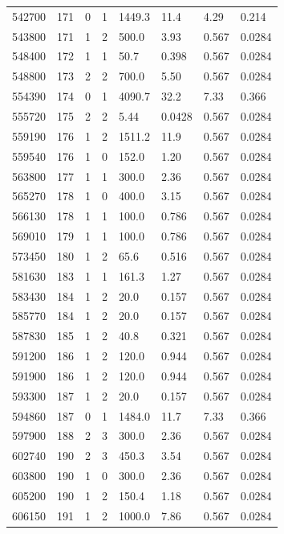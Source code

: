 \documentclass[preview]{standalone}
\begin{document}
{{{{{\begin{tabular}{L{1.2cm}C{1.2cm} C{0.3cm}C{0.5cm} C{1.4cm}C{1.4cm} C{1.4cm}C{1.4cm}}
  542700  &   171  & 0     &  1 &  1449.3  & 11.4  & 4.29 &  0.214   \\ 
  543800  &   171  & 1     &  2 &  500.0  & 3.93  & 0.567 &  0.0284   \\ 
  548400  &   172  & 1     &  1 &  50.7  & 0.398  & 0.567 &  0.0284   \\ 
  548800  &   173  & 2     &  2 &  700.0  & 5.50  & 0.567 &  0.0284   \\ 
  554390  &   174  & 0     &  1 &  4090.7  & 32.2  & 7.33 &  0.366   \\ 
  555720  &   175  & 2     &  2 &  5.44  & 0.0428  & 0.567 &  0.0284   \\ 
  559190  &   176  & 1     &  2 &  1511.2  & 11.9  & 0.567 &  0.0284   \\ 
  559540  &   176  & 1     &  0 &  152.0  & 1.20  & 0.567 &  0.0284   \\ 
  563800  &   177  & 1     &  1 &  300.0  & 2.36  & 0.567 &  0.0284   \\ 
  565270  &   178  & 1     &  0 &  400.0  & 3.15  & 0.567 &  0.0284   \\ 
  566130  &   178  & 1     &  1 &  100.0  & 0.786  & 0.567 &  0.0284   \\ 
  569010  &   179  & 1     &  1 &  100.0  & 0.786  & 0.567 &  0.0284   \\ 
  573450  &   180  & 1     &  2 &  65.6  & 0.516  & 0.567 &  0.0284   \\ 
  581630  &   183  & 1     &  1 &  161.3  & 1.27  & 0.567 &  0.0284   \\ 
  583430  &   184  & 1     &  2 &  20.0  & 0.157  & 0.567 &  0.0284   \\ 
  585770  &   184  & 1     &  2 &  20.0  & 0.157  & 0.567 &  0.0284   \\ 
  587830  &   185  & 1     &  2 &  40.8  & 0.321  & 0.567 &  0.0284   \\ 
  591200  &   186  & 1     &  2 &  120.0  & 0.944  & 0.567 &  0.0284   \\ 
  591900  &   186  & 1     &  2 &  120.0  & 0.944  & 0.567 &  0.0284   \\ 
  593300  &   187  & 1     &  2 &  20.0  & 0.157  & 0.567 &  0.0284   \\ 
  594860  &   187  & 0     &  1 &  1484.0  & 11.7  & 7.33 &  0.366   \\ 
  597900  &   188  & 2     &  3 &  300.0  & 2.36  & 0.567 &  0.0284   \\ 
  602740  &   190  & 2     &  3 &  450.3  & 3.54  & 0.567 &  0.0284   \\ 
  603800  &   190  & 1     &  0 &  300.0  & 2.36  & 0.567 &  0.0284   \\ 
  605200  &   190  & 1     &  2 &  150.4  & 1.18  & 0.567 &  0.0284   \\ 
  606150  &   191  & 1     &  2 &  1000.0  & 7.86  & 0.567 &  0.0284   \\ 
\hline 
\end{tabular} 

}}}}}
\end{document}
